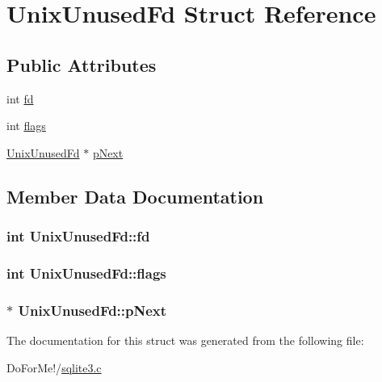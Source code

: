 \hypertarget{struct_unix_unused_fd}{\section{Unix\-Unused\-Fd Struct Reference}
\label{struct_unix_unused_fd}
}
\subsection*{Public Attributes}
\begin{DoxyCompactItemize}
\item 
int \hyperlink{struct_unix_unused_fd_a3f1a6127218af971aeb7b131c9c1600d}{fd}
\item 
int \hyperlink{struct_unix_unused_fd_a744cd118bd91ec2019108e8205708684}{flags}
\item 
\hyperlink{struct_unix_unused_fd}{Unix\-Unused\-Fd} $\ast$ \hyperlink{struct_unix_unused_fd_a6bbcba75beeabdd2df126638bc1d8bc0}{p\-Next}
\end{DoxyCompactItemize}


\subsection{Member Data Documentation}
\hypertarget{struct_unix_unused_fd_a3f1a6127218af971aeb7b131c9c1600d}{
\subsubsection[{fd}]{\setlength{\rightskip}{0pt plus 5cm}int Unix\-Unused\-Fd\-::fd}}\label{struct_unix_unused_fd_a3f1a6127218af971aeb7b131c9c1600d}
\hypertarget{struct_unix_unused_fd_a744cd118bd91ec2019108e8205708684}{
\subsubsection[{flags}]{\setlength{\rightskip}{0pt plus 5cm}int Unix\-Unused\-Fd\-::flags}}\label{struct_unix_unused_fd_a744cd118bd91ec2019108e8205708684}
\hypertarget{struct_unix_unused_fd_a6bbcba75beeabdd2df126638bc1d8bc0}{
\subsubsection[{p\-Next}]{$\ast$ Unix\-Unused\-Fd\-::p\-Next}}\label{struct_unix_unused_fd_a6bbcba75beeabdd2df126638bc1d8bc0}


The documentation for this struct was generated from the following file\-:\begin{DoxyCompactItemize}
\item 
Do\-For\-Me!/\hyperlink{sqlite3_8c}{sqlite3.\-c}\end{DoxyCompactItemize}

